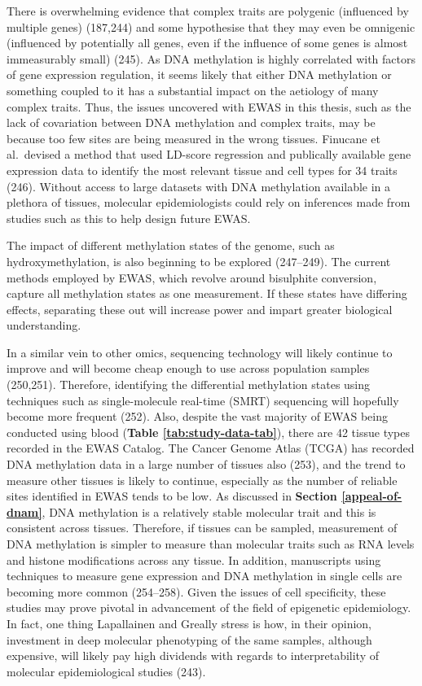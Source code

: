 \documentclass[11pt,oneside]{bristolthesis}
\begin{document}
There is overwhelming evidence that complex traits are polygenic (influenced by multiple genes) (187,244) and some hypothesise that they may even be omnigenic (influenced by potentially all genes, even if the influence of some genes is almost immeasurably small) (245). As DNA methylation is highly correlated with factors of gene expression regulation, it seems likely that either DNA methylation or something coupled to it has a substantial impact on the aetiology of many complex traits. Thus, the issues uncovered with EWAS in this thesis, such as the lack of covariation between DNA methylation and complex traits, may be because too few sites are being measured in the wrong tissues. Finucane et al.~devised a method that used LD-score regression and publically available gene expression data to identify the most relevant tissue and cell types for 34 traits (246). Without access to large datasets with DNA methylation available in a plethora of tissues, molecular epidemiologists could rely on inferences made from studies such as this to help design future EWAS.

The impact of different methylation states of the genome, such as hydroxymethylation, is also beginning to be explored (247--249). The current methods employed by EWAS, which revolve around bisulphite conversion, capture all methylation states as one measurement. If these states have differing effects, separating these out will increase power and impart greater biological understanding.

In a similar vein to other omics, sequencing technology will likely continue to improve and will become cheap enough to use across population samples (250,251). Therefore, identifying the differential methylation states using techniques such as single-molecule real-time (SMRT) sequencing will hopefully become more frequent (252). Also, despite the vast majority of EWAS being conducted using blood (\textbf{Table \ref{tab:study-data-tab}}), there are 42 tissue types recorded in the EWAS Catalog. The Cancer Genome Atlas (TCGA) has recorded DNA methylation data in a large number of tissues also (253), and the trend to measure other tissues is likely to continue, especially as the number of reliable sites identified in EWAS tends to be low. As discussed in \textbf{Section \ref{appeal-of-dnam}}, DNA methylation is a relatively stable molecular trait and this is consistent across tissues. Therefore, if tissues can be sampled, measurement of DNA methylation is simpler to measure than molecular traits such as RNA levels and histone modifications across any tissue. In addition, manuscripts using techniques to measure gene expression and DNA methylation in single cells are becoming more common (254--258). Given the issues of cell specificity, these studies may prove pivotal in advancement of the field of epigenetic epidemiology. In fact, one thing Lapallainen and Greally stress is how, in their opinion, investment in deep molecular phenotyping of the same samples, although expensive, will likely pay high dividends with regards to interpretability of molecular epidemiological studies (243).
\end{document}
